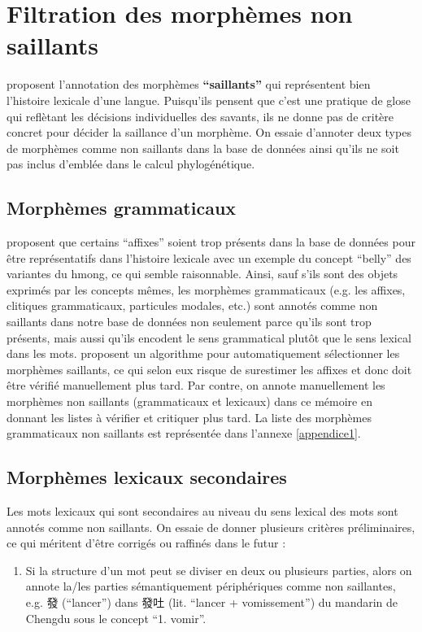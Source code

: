 \documentclass{scrbook}
\newcounter{c}[subsubsection]
\begin{document}
\begin{sloppypar}
\section{Filtration des morphèmes non saillants}\label{filtr_non_saillant}
\textcite[3]{wu2023annotating} proposent l'annotation des morphèmes \textbf{``saillants''} qui représentent bien l'histoire lexicale d'une langue. Puisqu'ils pensent que c'est une pratique de glose qui reflètant les décisions individuelles des savants, ils ne donne pas de critère concret pour décider la saillance d'un morphème. On essaie d'annoter deux types de morphèmes comme non saillants dans la base de données ainsi qu'ils ne soit pas inclus d'emblée dans le calcul phylogénétique.

\subsection{Morphèmes grammaticaux}
\textcite[8]{wu2023annotating} proposent que certains ``affixes'' soient trop présents dans la base de données pour être représentatifs dans l'histoire lexicale avec un exemple du concept ``belly'' des variantes du hmong, ce qui semble raisonnable. Ainsi, sauf s'ils sont des objets exprimés par les concepts mêmes, les morphèmes grammaticaux (e.g. les affixes, clitiques grammaticaux, particules modales, etc.) sont annotés comme non saillants dans notre base de données non seulement parce qu'ils sont trop présents, mais aussi qu'ils encodent le sens grammatical plutôt que le sens lexical dans les mots. \textcite[17]{wu2023annotating} proposent un algorithme pour automatiquement sélectionner les morphèmes saillants, ce qui selon eux risque de surestimer les affixes et donc doit être vérifié manuellement plus tard. Par contre, on annote manuellement les morphèmes non saillants (grammaticaux et lexicaux) dans ce mémoire en donnant les listes à vérifier et critiquer plus tard. La liste des morphèmes grammaticaux non saillants est représentée dans l'annexe \ref{appendice1}. 

\subsection{Morphèmes lexicaux secondaires}
Les mots lexicaux qui sont secondaires au niveau du sens lexical des mots sont annotés comme non saillants. On essaie de donner plusieurs critères préliminaires, ce qui méritent d'être corrigés ou raffinés dans le futur :

\begin{enumerate}
\item{Si la structure d'un mot peut se diviser en deux ou plusieurs parties, alors on annote la/les parties sémantiquement périphériques comme non saillantes, e.g. 發 (``lancer'') dans 發吐 (lit. ``lancer + vomissement'') du mandarin de Chengdu sous le concept ``1. vomir''.}


\end{enumerate}
\end{sloppypar}
\end{document}
